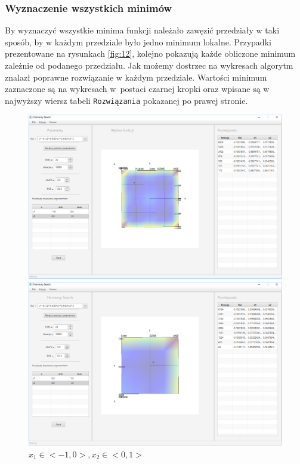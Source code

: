 \documentclass[10pt, a4paper]{article}
\begin{document}
\subsubsection{Wyznaczenie wszystkich minimów}
\label{subsubsec:fcn4min2}
By wyznaczyć wszystkie minima funkcji należało zawęzić przedziały w taki sposób, by w każdym przedziale było jedno minimum lokalne. Przypadki prezentowane na rysunkach \ref{fig:12}, kolejno pokazują każde obliczone minimum zależnie od podanego przedziału. Jak możemy dostrzec na wykresach algorytm znalazł poprawne rozwiązanie w każdym przedziale. Wartości minimum zaznaczone są na wykresach w~postaci czarnej kropki oraz wpisane są w najwyższy wiersz tabeli {\tt Rozwiązania} pokazanej po prawej stronie. 
\begin{figure}[htbp]
	\begin{minipage}[b]{.5\textwidth}
		\centering
		\includegraphics[width=\linewidth]{images/16.PNG}
		\caption{$x_{1}\in<-1,0>,  x_{2}\in<0,1>$}
	\end{minipage}
	\begin{minipage}[b]{.5\textwidth}
		\centering
		\includegraphics[width=\linewidth]{images/12.PNG}

\end{minipage}
\end{figure}
\end{document}
